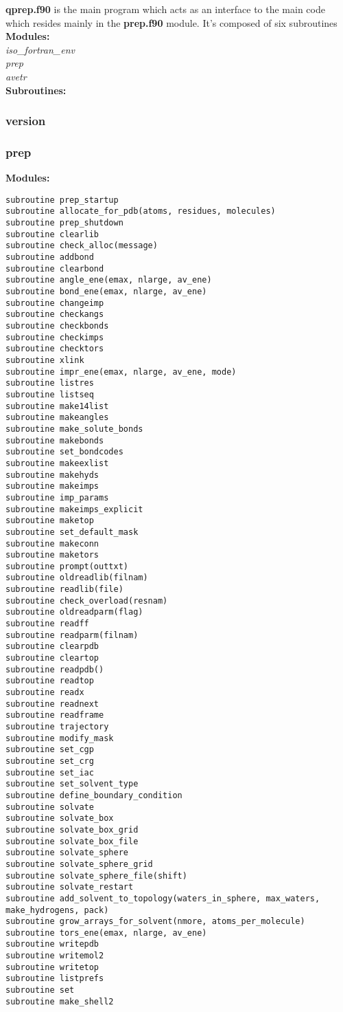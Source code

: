 \documentclass[10pt, oneside, pdftex]{article}
\begin{document}
\textbf{qprep.f90} is the  main program which acts as  an interface to
the main  code which resides  mainly in the  \textbf{prep.f90} module.
It's composed of six subroutines\\



\textbf{Modules: }\\
\textit{iso\_fortran\_env}\\
\textit{prep}\\
\textit{avetr}\\


\textbf{Subroutines: }\\


\subsubsection{version} 
\subsubsection{prep}
\textbf{Modules: }\\
\textit{}



\begin{Verbatim}
subroutine prep_startup
subroutine allocate_for_pdb(atoms, residues, molecules)
subroutine prep_shutdown
subroutine clearlib
subroutine check_alloc(message)
subroutine addbond
subroutine clearbond
subroutine angle_ene(emax, nlarge, av_ene)
subroutine bond_ene(emax, nlarge, av_ene)
subroutine changeimp
subroutine checkangs
subroutine checkbonds
subroutine checkimps
subroutine checktors
subroutine xlink
subroutine impr_ene(emax, nlarge, av_ene, mode)
subroutine listres
subroutine listseq
subroutine make14list
subroutine makeangles
subroutine make_solute_bonds
subroutine makebonds
subroutine set_bondcodes
subroutine makeexlist
subroutine makehyds
subroutine makeimps
subroutine imp_params
subroutine makeimps_explicit
subroutine maketop
subroutine set_default_mask
subroutine makeconn
subroutine maketors
subroutine prompt(outtxt)
subroutine oldreadlib(filnam)
subroutine readlib(file)
subroutine check_overload(resnam)
subroutine oldreadparm(flag)
subroutine readff
subroutine readparm(filnam)
subroutine clearpdb
subroutine cleartop
subroutine readpdb()
subroutine readtop
subroutine readx
subroutine readnext
subroutine readframe
subroutine trajectory
subroutine modify_mask
subroutine set_cgp
subroutine set_crg
subroutine set_iac
subroutine set_solvent_type
subroutine define_boundary_condition
subroutine solvate
subroutine solvate_box
subroutine solvate_box_grid
subroutine solvate_box_file
subroutine solvate_sphere
subroutine solvate_sphere_grid
subroutine solvate_sphere_file(shift)
subroutine solvate_restart
subroutine add_solvent_to_topology(waters_in_sphere, max_waters,
make_hydrogens, pack)
subroutine grow_arrays_for_solvent(nmore, atoms_per_molecule)
subroutine tors_ene(emax, nlarge, av_ene)
subroutine writepdb
subroutine writemol2
subroutine writetop
subroutine listprefs
subroutine set
subroutine make_shell2
\end{Verbatim}
 
\end{document}
